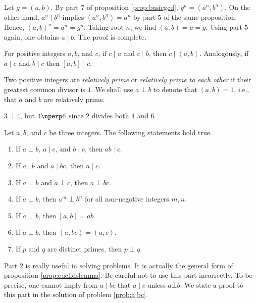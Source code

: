 \begin{solution}
	Let $g=(a,b)$. By part $7$ of proposition \eqref{prop:basicgcd}, $g^n = (a^n,b^n)$. On the other hand, $a^n\mid b^n$ implies $(a^n, b^n)=a^n$ by part $5$ of the same proposition. Hence, $(a, b)^n=a^n=g^n$. Taking root $n$, we find $(a,b)=a=g$. Using part $5$ again, one obtains $a\mid b$. The proof is complete.

\end{solution}

\begin{proposition}\label{prop:dividegcd}
	For positive integers $a, b$, and $c$, if $c \mid a$ and $c\mid b$, then $c\mid (a,b)$. Analogously, if $a\mid c$ and $b\mid c$ then $[a,b]\mid c$.
\end{proposition}

\begin{definition}
	Two positive integers are \textit{relatively prime} or \textit{relatively prime to each other} if their greatest common divisor is $1$. We shall use $a\perp b$ to denote that $(a,b)=1$, i.e., that $a$ and $b$ are relatively prime.
\end{definition}

\begin{example}
	$3\perp4$, but $4\nperp6$ since $2$ divides both $4$ and $6$.
\end{example}

\begin{proposition}\label{prop:cpdiv}
	Let $a, b$, and $c$ be three integers. The following statements hold true.
	\begin{enumerate}
		\item If $a\perp b$, $a\mid c$, and $b\mid c$, then $ab\mid c$.
		\item If $a \bot b$ and $a\mid bc$, then $a\mid c$.
		\item If $a\perp b$ and $a\perp c$, then $a\perp bc$.
		\item If $a\perp b$, then $a^m\perp b^n$ for all non-negative integers $m,n$.
		\item If $a \perp b$, then $[a,b]=ab$.
		\item If $a \perp b$, then $(a,bc)=(a,c)$.
		\item If $p$ and $q$ are distinct primes, then $p \perp q$.
	\end{enumerate}
\end{proposition}

\begin{note}[1]
	Part $2$ is really useful in solving problems. It is actually the general form of proposition \eqref{prop:euclidslemma}. Be careful not to use this part incorrectly. To be precise, one cannot imply from $a\mid bc$ that $a\mid c$ unless $a \bot b$. We state a proof to this part in the solution of problem \eqref{prob:a|bc}.
\end{note}

